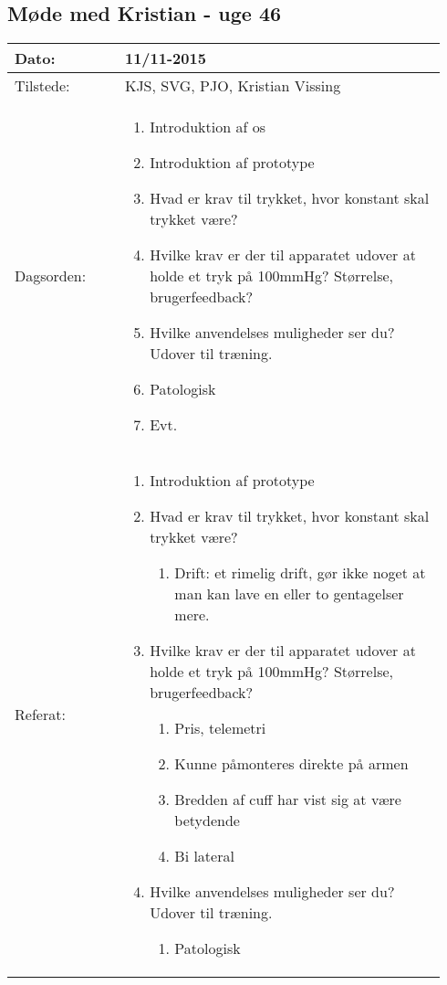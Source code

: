 	\subsection{Møde med Kristian - uge 46} \label{app:kristianuge46}
	\begin{longtable}{|p{0.24\linewidth}|p{0.7\linewidth}|}
		\hline
		Dato: & 11/11-2015\\ \hline
		Tilstede: & KJS, SVG, PJO, Kristian Vissing\\ \hline
		Dagsorden: &
		\begin{enumerate}
			\item Introduktion af os
			\item Introduktion af prototype
			\item Hvad er krav til trykket, hvor konstant skal trykket være?
			\item Hvilke krav er der til apparatet udover at holde et tryk på 100mmHg? Størrelse, brugerfeedback? 
			\item Hvilke anvendelses muligheder ser du? Udover til træning. 
			\item Patologisk
			\item Evt.
		\end{enumerate}
		\\ \hline
		Referat: & 
		\begin{enumerate}
			\item Introduktion af prototype
			\item Hvad er krav til trykket, hvor konstant skal trykket være?
			\begin{enumerate}
				\item Drift: et rimelig drift, gør ikke noget at man kan lave en eller to gentagelser mere. 
			\end{enumerate}
			\item Hvilke krav er der til apparatet udover at holde et tryk på 100mmHg? Størrelse, brugerfeedback? 
			\begin{enumerate}
				\item Pris, telemetri
				\item Kunne påmonteres direkte på armen
				\item Bredden af cuff har vist sig at være betydende
				\item Bi lateral 
			\end{enumerate}
			\item Hvilke anvendelses muligheder ser du? Udover til træning. 
			\begin{enumerate}
				\item Patologisk

\end{enumerate}
\end{enumerate}
\end{longtable}
